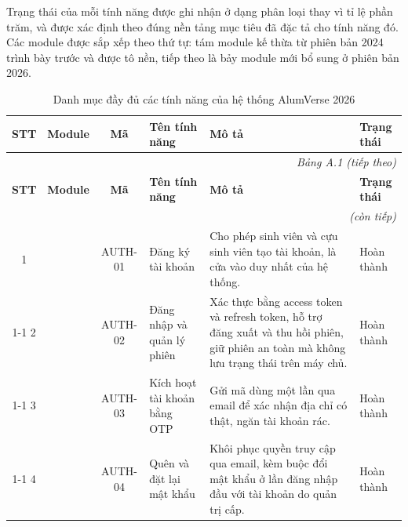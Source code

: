 \documentclass[12pt,a4paper,oneside]{report}
\begin{document}
Trạng thái của mỗi tính năng được ghi nhận ở dạng phân loại thay vì tỉ lệ phần trăm, và được xác định theo đúng nền tảng mục tiêu đã đặc tả cho tính năng đó. Các module được sắp xếp theo thứ tự: tám module kế thừa từ phiên bản 2024 trình bày trước và được tô nền, tiếp theo là bảy module mới bổ sung ở phiên bản 2026.

\begin{landscape}
\renewcommand{\arraystretch}{1.25}
\begin{longtable}{|c|>{\raggedright\arraybackslash}p{3.1cm}|c|>{\raggedright\arraybackslash}p{4.6cm}|>{\raggedright\arraybackslash}p{8.4cm}|>{\raggedright\arraybackslash}p{2.4cm}|}
\caption{Danh mục đầy đủ các tính năng của hệ thống AlumVerse 2026}\label{tab:appendixA}\\
\hline
\textbf{STT} & \textbf{Module} & \textbf{Mã} & \textbf{Tên tính năng} & \textbf{Mô tả} & \textbf{Trạng thái} \\ \hline
\endfirsthead
\multicolumn{6}{r}{\itshape\small Bảng A.1 (tiếp theo)}\\[2pt]
\hline
\textbf{STT} & \textbf{Module} & \textbf{Mã} & \textbf{Tên tính năng} & \textbf{Mô tả} & \textbf{Trạng thái} \\ \hline
\endhead
\hline \multicolumn{6}{r}{\itshape\small (còn tiếp)}\\
\endfoot
\hline
\endlastfoot
\cellcolor{oldrow}1 & \cellcolor{oldrow} & \cellcolor{oldrow}AUTH-01 & \cellcolor{oldrow}Đăng ký tài khoản & \cellcolor{oldrow}Cho phép sinh viên và cựu sinh viên tạo tài khoản, là cửa vào duy nhất của hệ thống. & \cellcolor{oldrow}Hoàn thành \\
\cline{1-1}\cline{3-6}
\cellcolor{oldrow}2 & \cellcolor{oldrow} & \cellcolor{oldrow}AUTH-02 & \cellcolor{oldrow}Đăng nhập và quản lý phiên & \cellcolor{oldrow}Xác thực bằng access token và refresh token, hỗ trợ đăng xuất và thu hồi phiên, giữ phiên an toàn mà không lưu trạng thái trên máy chủ. & \cellcolor{oldrow}Hoàn thành \\
\cline{1-1}\cline{3-6}
\cellcolor{oldrow}3 & \cellcolor{oldrow} & \cellcolor{oldrow}AUTH-03 & \cellcolor{oldrow}Kích hoạt tài khoản bằng OTP & \cellcolor{oldrow}Gửi mã dùng một lần qua email để xác nhận địa chỉ có thật, ngăn tài khoản rác. & \cellcolor{oldrow}Hoàn thành \\
\cline{1-1}\cline{3-6}
\cellcolor{oldrow}4 & \cellcolor{oldrow} & \cellcolor{oldrow}AUTH-04 & \cellcolor{oldrow}Quên và đặt lại mật khẩu & \cellcolor{oldrow}Khôi phục quyền truy cập qua email, kèm buộc đổi mật khẩu ở lần đăng nhập đầu với tài khoản do quản trị cấp. & \cellcolor{oldrow}Hoàn thành \\

\end{longtable}
\end{landscape}
\end{document}
